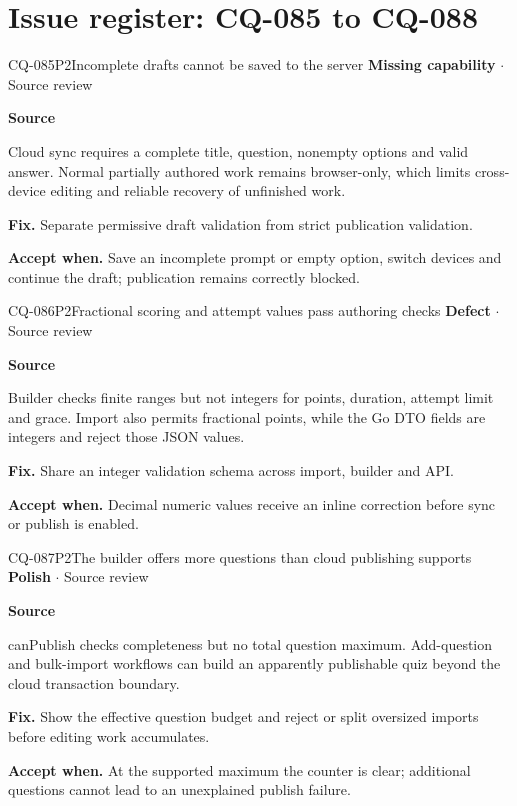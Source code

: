 \section*{Issue register: CQ-085 to CQ-088}
\begin{finding}{CQ-085}{P2}{Incomplete drafts cannot be saved to the server}
\textbf{Missing capability} $\cdot$ Source review\par
\textbf{Source}\quad{}\par
Cloud sync requires a complete title, question, nonempty options and valid answer. Normal partially authored work remains browser-only, which limits cross-device editing and reliable recovery of unfinished work.\par
\textbf{Fix.} Separate permissive draft validation from strict publication validation.\par
\textbf{Accept when.} Save an incomplete prompt or empty option, switch devices and continue the draft; publication remains correctly blocked.
\end{finding}
\begin{finding}{CQ-086}{P2}{Fractional scoring and attempt values pass authoring checks}
\textbf{Defect} $\cdot$ Source review\par
\textbf{Source}\quad{}\par
Builder checks finite ranges but not integers for points, duration, attempt limit and grace. Import also permits fractional points, while the Go DTO fields are integers and reject those JSON values.\par
\textbf{Fix.} Share an integer validation schema across import, builder and API.\par
\textbf{Accept when.} Decimal numeric values receive an inline correction before sync or publish is enabled.
\end{finding}
\begin{finding}{CQ-087}{P2}{The builder offers more questions than cloud publishing supports}
\textbf{Polish} $\cdot$ Source review\par
\textbf{Source}\quad{}\par
canPublish checks completeness but no total question maximum. Add-question and bulk-import workflows can build an apparently publishable quiz beyond the cloud transaction boundary.\par
\textbf{Fix.} Show the effective question budget and reject or split oversized imports before editing work accumulates.\par
\textbf{Accept when.} At the supported maximum the counter is clear; additional questions cannot lead to an unexplained publish failure.
\end{finding}
